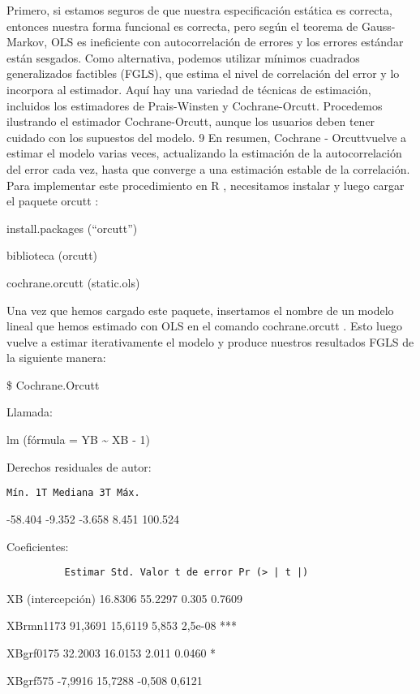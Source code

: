 \documentclass[
]{book}
\begin{document}
Primero, si estamos seguros de que nuestra especificación estática es correcta, entonces nuestra forma funcional es correcta, pero según el teorema de Gauss-Markov, OLS es ineficiente con autocorrelación de errores y los errores estándar están sesgados. Como alternativa, podemos utilizar mínimos cuadrados generalizados factibles (FGLS), que estima el nivel de correlación del error y lo incorpora al estimador. Aquí hay una variedad de técnicas de estimación, incluidos los estimadores de Prais-Winsten y Cochrane-Orcutt. Procedemos ilustrando el estimador Cochrane-Orcutt, aunque los usuarios deben tener cuidado con los supuestos del modelo. 9 En resumen, Cochrane - Orcuttvuelve a estimar el modelo varias veces, actualizando la estimación de la autocorrelación del error cada vez, hasta que converge a una estimación estable de la correlación. Para implementar este procedimiento en R , necesitamos instalar y luego cargar el paquete orcutt :

install.packages (``orcutt'')

biblioteca (orcutt)

cochrane.orcutt (static.ols)

Una vez que hemos cargado este paquete, insertamos el nombre de un modelo lineal que hemos estimado con OLS en el comando cochrane.orcutt . Esto luego vuelve a estimar iterativamente el modelo y produce nuestros resultados FGLS de la siguiente manera:

\$ Cochrane.Orcutt

Llamada:

lm (fórmula = YB \textasciitilde{} XB - 1)

Derechos residuales de autor:

\begin{verbatim}
Mín. 1T Mediana 3T Máx.
\end{verbatim}

-58.404 -9.352 -3.658 8.451 100.524

Coeficientes:

\begin{verbatim}
          Estimar Std. Valor t de error Pr (> | t |)
\end{verbatim}

XB (intercepción) 16.8306 55.2297 0.305 0.7609

XBrmn1173 91,3691 15,6119 5,853 2,5e-08 ***

XBgrf0175 32.2003 16.0153 2.011 0.0460 *

XBgrf575 -7,9916 15,7288 -0,508 0,6121
\end{document}
